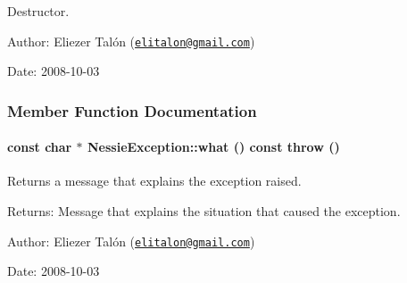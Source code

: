 Destructor. 

\begin{Desc}
\item[Author:]Eliezer Talón (\href{mailto:elitalon@gmail.com}{\tt elitalon@gmail.com}) \end{Desc}
\begin{Desc}
\item[Date:]2008-10-03 \end{Desc}


\subsubsection{Member Function Documentation}
\hypertarget{class_nessie_exception_a522c2ea164e88be0b26670170b33909}{
\paragraph[{what}]{\setlength{\rightskip}{0pt plus 5cm}const char $\ast$ NessieException::what () const  throw ()}\hfill}
\label{class_nessie_exception_a522c2ea164e88be0b26670170b33909}


Returns a message that explains the exception raised. 

\begin{Desc}
\item[Returns:]Message that explains the situation that caused the exception.\end{Desc}
\begin{Desc}
\item[Author:]Eliezer Talón (\href{mailto:elitalon@gmail.com}{\tt elitalon@gmail.com}) \end{Desc}
\begin{Desc}
\item[Date:]2008-10-03 \end{Desc}
